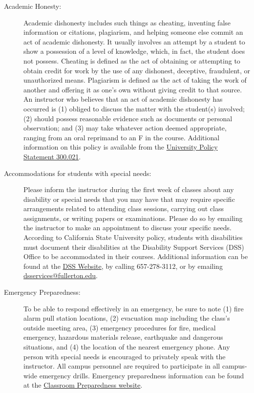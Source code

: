 \documentclass[11pt]{article}
\begin{document}
\begin{description}
\begin{description}
	\item[Academic Honesty:] Academic dishonesty includes such things as cheating, inventing false information or citations, plagiarism, and helping someone else commit an act of academic dishonesty. It usually involves an attempt by a student to show a possession of a level of knowledge, which, in fact, the student does not possess. Cheating is defined as the act of obtaining or attempting to obtain credit for work by the use of any dishonest, deceptive, fraudulent, or unauthorized means. Plagiarism is defined as the act of taking the work of another and offering it as one's own without giving credit to that source. An instructor who believes that an act of academic dishonesty has occurred is (1) obliged to discuss the matter with the student(s) involved; (2) should possess reasonable evidence such as documents or personal observation; and (3) may take whatever action deemed appropriate, ranging from an oral reprimand to an F in the course. Additional information on this policy is available from the \href{http://www.fullerton.edu/senate/publications_policies_resolutions/ups/UPS 300/UPS 300.021.pdf}{University Policy Statement 300.021}.
	
		\item[Accommodations for students with special needs:] Please inform the instructor during the first week of classes about any disability or special needs that you may have that may require specific arrangements related to attending class sessions, carrying out class assignments, or writing papers or examinations. Please do so by emailing the instructor to make an appointment to discuss your specific needs. According to California State University policy, students with disabilities must document their disabilities at the Disability Support Services (DSS) Office to be accommodated in their courses. Additional information can be found at the \href{http://www.fullerton.edu/dss}{DSS Website}, by calling 657-278-3112, or by emailing \href{mailto: dsservices@fullerton.edu}{dsservices@fullerton.edu}.  
	
		\item[Emergency Preparedness:] To be able to respond effectively in an emergency, be sure to note (1) fire alarm pull station locations, (2) evacuation map including the class's outside meeting area, (3) emergency procedures for fire, medical emergency, hazardous materials release, earthquake and dangerous situations, and (4) the location of the nearest emergency phone. Any person with special needs is encouraged to privately speak with the instructor. All campus personnel are required to participate in all campus-wide emergency drills. Emergency preparedness information can be found at the \href{http://prepare.fullerton.edu/campuspreparedness/ClassroomPreparedness.asp}{Classroom Preparedness website}.
	

\end{description}
\end{description}
\end{document}
